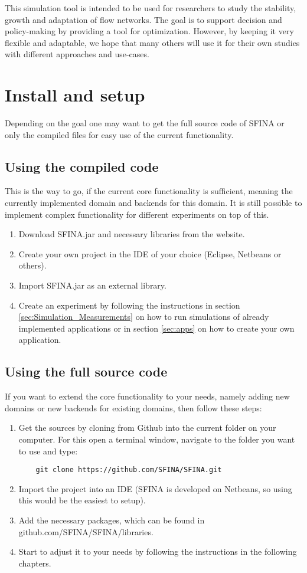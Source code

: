 \documentclass[11pt,fleqn]{book} %
\begin{document}
This simulation tool is intended to be used for researchers to study the stability, growth and adaptation of flow networks. The goal is to support decision and policy-making by providing a tool for optimization. However, by keeping it very flexible and adaptable, we hope that many others will use it for their own studies with different approaches and use-cases.

\section{Install and setup}
Depending on the goal one may want to get the full source code of SFINA or only the compiled files for easy use of the current functionality.

\subsection{Using the compiled code}
This is the way to go, if the current core functionality is sufficient, meaning the currently implemented domain and backends for this domain. It is still possible to implement complex functionality for different experiments on top of this.

\begin{enumerate}
	\item Download SFINA.jar and necessary libraries from the website.
	\item Create your own project in the IDE of your choice (Eclipse, Netbeans or others).
	\item Import SFINA.jar as an external library.
	\item Create an experiment by following the instructions in section \ref{sec:Simulation_Measurements} on how to run simulations of already implemented applications or in section \ref{sec:apps} on how to create your own application.
\end{enumerate}

\subsection{Using the full source code}
If you want to extend the core functionality to your needs, namely adding new domains or new backends for existing domains, then follow these steps:
\begin{enumerate}
	\item Get the sources by cloning from Github into the current folder on your computer. For this open a terminal window, navigate to the folder you want to use and type: 
	\begin{lstlisting}
	git clone https://github.com/SFINA/SFINA.git
	\end{lstlisting}
	\item Import the project into an IDE (SFINA is developed on Netbeans, so using this would be the easiest to setup).
	\item Add the necessary packages, which can be found in github.com/SFINA/SFINA/libraries.
	\item Start to adjust it to your needs by following the instructions in the following chapters.
\end{enumerate}
\end{document}
